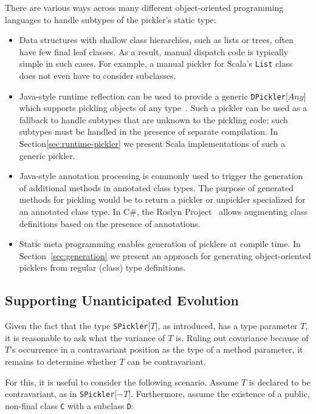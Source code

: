 \documentclass[preprint,10pt]{sigplanconf}
\theoremstyle{definition}
\newcommand{\term}[1]{\mbox{\texttt{#1}}}
\begin{document}
There are various ways across many different object-oriented programming
languages to handle subtypes of the pickler's static type:

\begin{itemize}
\item Data structures with shallow class hierarchies, such as lists or trees,
often have few final leaf classes. As a result, manual dispatch code is
typically simple in such cases. For example, a manual pickler for Scala's
\term{List} class does not even have to consider subclasses.

\item Java-style runtime reflection can be used to provide a generic
\term{DPickler}[$Any$] which supports pickling objects of any
type~\cite{JavaSerialization,Philippsen2000}. Such a pickler can be used as a
fallback to handle subtypes that are unknown to the pickling code; such
subtypes must be handled in the presence of separate compilation. In
Section\ref{sec:runtime-pickler} we present Scala implementations of such a
generic pickler.

\item Java-style annotation processing is commonly used to trigger the
generation of additional methods in annotated class types. The purpose of
generated methods for pickling would be to return a pickler or unpickler
specialized for an annotated class type. In C\#, the Roslyn
Project~\cite{Roslyn} allows augmenting class definitions based on the
presence of annotations.

\item Static meta programming \cite{Burmako2012,Nemerle} enables generation of
picklers at compile time. In Section~\ref{sec:generation} we present an
approach for generating object-oriented picklers from regular (class) type
definitions.
\end{itemize}

\subsection{Supporting Unanticipated Evolution}

Given the fact that the type \term{SPickler}[$T$], as introduced, has a type
parameter $T$, it is reasonable to ask what the variance of $T$ is. Ruling out
covariance because of $T$'s occurrence in a contravariant position as the type
of a method parameter, it remains to determine whether $T$ can be
contravariant.

For this, it is useful to consider the following scenario. Assume $T$ is
declared to be contravariant, as in \term{SPickler}[$-T$]. Furthermore, assume
the existence of a public, non-final class \term{C} with a subclass \term{D}:
\end{document}
